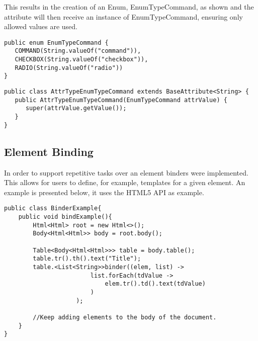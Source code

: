 \noindent
This results in the creation of an Enum, EnumTypeCommand, as shown and the attribute will then receive an instance of EnumTypeCommand, ensuring only allowed values are used.

\bigskip

\lstset{language=Java}

\begin{minipage}{\linewidth}
\begin{lstlisting}[caption={Enumeration Class},captionpos=b]
public enum EnumTypeCommand {
   COMMAND(String.valueOf("command")),
   CHECKBOX(String.valueOf("checkbox")),
   RADIO(String.valueOf("radio"))
}
\end{lstlisting}
\end{minipage}

\begin{minipage}{\linewidth}
\begin{lstlisting}[caption={Attribute Receiving An Enumeration},captionpos=b]
public class AttrTypeEnumTypeCommand extends BaseAttribute<String> {
   public AttrTypeEnumTypeCommand(EnumTypeCommand attrValue) {
      super(attrValue.getValue());
   }
}
\end{lstlisting}
\end{minipage}

\newpage

\subsection{Element Binding}
\label{sec:elementbinding}

In order to support repetitive tasks over an element binders were implemented. This allows for users to define, for example, templates for a given element. An example is presented below, it uses the \ac{HTML}5 \ac{API} as example.

\bigskip

\begin{minipage}{\linewidth}
\begin{lstlisting}[caption={Attribute Receiving An Enumeration},captionpos=b]
public class BinderExample{
    public void bindExample(){
        Html<Html> root = new Html<>();
        Body<Html<Html>> body = root.body();
        
        Table<Body<Html<Html>>> table = body.table();
        table.tr().th().text("Title");
        table.<List<String>>binder((elem, list) ->
                        list.forEach(tdValue ->
                            elem.tr().td().text(tdValue)
                        )
                    );
        
        //Keep adding elements to the body of the document.
    }
}
\end{lstlisting}
\end{minipage}

